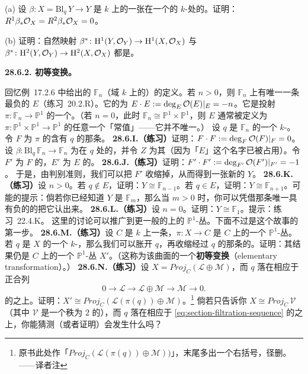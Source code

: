 (a) 设 $\beta\colon X=\mathrm{Bl}_q\,Y\to Y$ 是 $k$ 上的一张\trSmooth\trSurface{}在一个\trSmooth{}的 $k$-\trValuedPoint{}处的\trBlowup。证明：$R^1\beta_*\mathcal{O}_X=R^2\beta_*\mathcal{O}_X=0$。

(b) 证明：自然映射 $\beta^*\colon\mathrm{H}^1(Y,\mathcal{O}_Y)\to\mathrm{H}^1(X,\mathcal{O}_X)$ 与 $\beta^*\colon\mathrm{H}^2(Y,\mathcal{O}_Y)\to\mathrm{H}^2(X,\mathcal{O}_X)$ 都是\trIsomorphism。

\textbf{28.6.2. 初等变换。}

回忆\mbox{例~17.2.6} 中给出的\trHirzebruchSurface{} $\mathbb{F}_n$（域 $k$ 上的）的定义。若 $n>0$，则 $\mathbb{F}_n$ 上有唯一一条\trSelfIntersection{}最负的\trCurve{} $E$（\mbox{练习~20.2.R}）。它的\trSelfIntersection{}为 $E\cdot E:=\deg_E\mathcal{O}(E)|_E=-n$。它是投射 $\pi\colon\mathbb{F}_n\to\mathbb{P}^1$ 的一个\trSection{}。（若 $n=0$，此时 $\mathbb{F}_n\cong\mathbb{P}^1\times\mathbb{P}^1$，则 $E$ 通常被定义为 $\pi\colon\mathbb{P}^1\times\mathbb{P}^1\to\mathbb{P}^1$ 的任意一个「常值」\trSection{}——它并不唯一。）
设 $q$ 是 $\mathbb{F}_n$ 的一个 $k$-\trValuedPoint。令 $F$ 为 $\pi$ 的含有 $q$ 的那条\trFiber。
\textbf{28.6.I.（练习）}\quad 证明：$F\cdot F:=\deg_F\mathcal{O}(F)|_F=0$。
设 $\beta\colon\mathrm{Bl}_q\,\mathbb{F}_n\to\mathbb{F}_n$ 为在 $q$ 处的\trBlowup，并令 $Z$ 为其\trExceptionalDivisor（因为「$E$」这个名字已被占用）。令 $F'$ 为 $F$ 的\trProperTransform，$E'$ 为 $E$ 的\trProperTransform。
\textbf{28.6.J.（练习）}\quad 证明：$F'\cdot F':=\deg_{F'}\mathcal{O}(F')|_{F'}=-1$。
于是，由\trCastelnuovo{}判别准则，我们可以把 $F'$ 收缩掉，从而得到一张新的\trSurface{} $Y$。
\textbf{28.6.K.（练习）}\quad 设 $n>0$。若 $q\notin E$，证明：$Y\cong\mathbb{F}_{n-1}$。若 $q\in E$，证明：$Y\cong\mathbb{F}_{n+1}$。可能的提示：倘若你已经知道 $Y$ 是\trHirzebruchSurface{} $\mathbb{F}_m$，那么当 $m>0$ 时，你可以凭借那条唯一具有负\trSelfIntersection{}的\trCurve{}的\trSelfIntersection{}把它认出来。
\textbf{28.6.L.（练习）}\quad 设 $n=0$。证明：$Y\cong\mathbb{F}_1$。提示：\mbox{练习~22.4.K}。
这里的讨论可以推广到更一般的\trCurve{}上的 $\mathbb{P}^1$-丛。下面不过是这个故事的第一步。
\textbf{28.6.M.（练习）}\quad 设 $C$ 是 $k$ 上一条\trSmooth\trCurve，$\pi\colon X\to C$ 是 $C$ 上的一个 $\mathbb{P}^1$-丛。若 $q$ 是 $X$ 的一个 $k$-\trValuedPoint，那么我们可以胀开 $q$，再收缩经过 $q$ 的那条\trFiber{}的\trProperTransform。证明：其结果仍是 $C$ 上的一个 $\mathbb{P}^1$-丛 $X'$。（这称为该\trRuling{}曲面的一个\textbf{初等变换}（elementary transformation）。）
\textbf{28.6.N.（练习）}\quad 设 $X=\mathit{Proj}_C(\mathscr{L}\oplus\mathscr{M})$，而 $q$ 落在相应于正合列
\[
0\longrightarrow\mathscr{L}\longrightarrow\mathscr{L}\oplus\mathscr{M}\longrightarrow\mathscr{M}\longrightarrow 0.
\]
的\trSection{}之上。证明：$X'\cong\mathit{Proj}_C(\mathscr{L}(\pi(q))\oplus\mathscr{M})$。\footnote{原书此处作「$\mathit{Proj}_C(\mathscr{L}(\pi(q))\oplus\mathscr{M}))$」，末尾多出一个右括号，径删。——译者注}
倘若只告诉你 $X\cong\mathit{Proj}_C\,\mathscr{V}$（其中 $\mathscr{V}$ 是一个秩为 $2$ 的\trLocallyFreeSheaf），而 $q$ 落在相应于 \eqref{eq:section-filtration-sequence} 的\trSection{}之上，你能猜测（或者证明）会发生什么吗？

